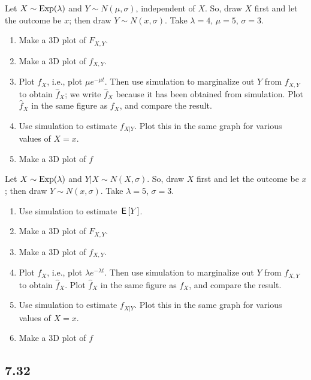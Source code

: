 \documentclass[a4paper]{article}
\begin{document}
\begin{exercise}
Let $X\sim\mathrm{Exp}(\lambda)$ and $Y \sim N(\mu, \sigma)$, independent of $X$.
So, draw $X$ first and let the outcome be $x$; then draw $Y\sim N(x, \sigma)$.
Take $\lambda=4$, $\mu = 5$, $\sigma=3$.
\begin{enumerate}
\item Make a 3D plot of $F_{X,Y}$.
\item Make a 3D plot of $f_{X,Y}$.
\item Plot $f_{X}$, i.e., plot $\mu e^{-\mu t}$.
  Then use simulation to marginalize out $Y$ from $f_{X,Y}$ to obtain $\hat f_X$; we write $\hat f_X$ because it has been obtained from simulation.
  Plot $\hat f_X$ in the same figure as $f_X$, and compare the result.
\item Use simulation to estimate $f_{X|Y}$. Plot this in the same graph for various values of $X=x$. 
\item Make a 3D plot of $f$
\end{enumerate}
\end{exercise}

\begin{exercise}
Let $X\sim\mathrm{Exp}(\lambda)$ and $Y| X \sim N(X, \sigma)$. So,  draw $X$ first and let the outcome be $x$;  then draw $Y\sim N(x, \sigma)$. Take $\lambda = 5$, $\sigma=3$. 
\begin{enumerate}
\item Use simulation to estimate $\,\mathsf{E}\left[Y\right]$. 
\item Make a 3D plot of $F_{X,Y}$.
\item Make a 3D plot of $f_{X,Y}$.
\item Plot $f_{X}$, i.e., plot $\lambda e^{-\lambda t}$.
  Then use simulation to marginalize out $Y$ from $f_{X,Y}$ to obtain $\hat f_X$.
  Plot $\hat f_X$ in the same figure as $f_X$, and compare the result.
\item Use simulation to estimate $f_{X|Y}$. Plot this in the same graph for various values of $X=x$. 
\item Make a 3D plot of $f$
\end{enumerate}
\end{exercise}





\subsection{7.32}
\label{sec:orga22aa79}
\end{document}
